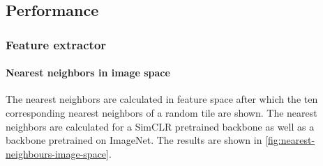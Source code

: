 \subsection{Performance}

\subsubsection{Feature extractor}

\paragraph{Nearest neighbors in image space}
The nearest neighbors are calculated in feature space after which the ten corresponding nearest neighbors of a random tile are shown.
The nearest neighbors are calculated for a SimCLR pretrained backbone as well as a backbone pretrained on ImageNet.
The results are shown in \cref{fig:nearest-neighbours-image-space}.

